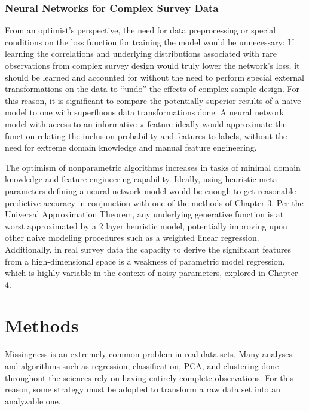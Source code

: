 \documentclass[12pt,twoside]{reedthesis}
\begin{document}
\subsection{Neural Networks for Complex Survey
Data}\label{neural-networks-for-complex-survey-data}

From an optimist's perspective, the need for data preprocessing or
special conditions on the loss function for training the model would be
unnecessary: If learning the correlations and underlying distributions
associated with rare observations from complex survey design would truly
lower the network's loss, it should be learned and accounted for without
the need to perform special external transformations on the data to
``undo'' the effects of complex sample design. For this reason, it is
significant to compare the potentially superior results of a naive model
to one with superfluous data transformations done. A neural network
model with access to an informative \(\pi\) feature ideally would
approximate the function relating the inclusion probability and features
to labels, without the need for extreme domain knowledge and manual
feature engineering.

The optimism of nonparametric algorithms increases in tasks of minimal
domain knowledge and feature engineering capability. Ideally, using
heuristic meta-parameters defining a neural network model would be
enough to get reasonable predictive accuracy in conjunction with one of
the methods of Chapter 3. Per the Universal Approximation Theorem, any
underlying generative function is at worst approximated by a 2 layer
heuristic model, potentially improving upon other naive modeling
procedures such as a weighted linear regression. Additionally, in real
survey data the capacity to derive the significant features from a
high-dimensional space is a weakness of parametric model regression,
which is highly variable in the context of noisy parameters, explored in
Chapter 4.

\chapter{Methods}\label{methods}

Missingness is an extremely common problem in real data sets. Many
analyses and algorithms such as regression, classification, PCA, and
clustering done throughout the sciences rely on having entirely complete
observations. For this reason, some strategy must be adopted to
transform a raw data set into an analyzable one.
\end{document}
